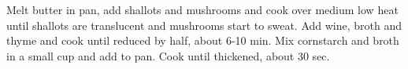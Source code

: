 Melt butter in pan, add shallots and mushrooms and cook over medium low heat until
shallots are translucent and mushrooms start to sweat.  
Add wine, broth and thyme and cook until reduced by half, about 6-10 min. 
Mix cornstarch and broth in a small cup and add to pan.  
Cook until thickened, about 30 sec.